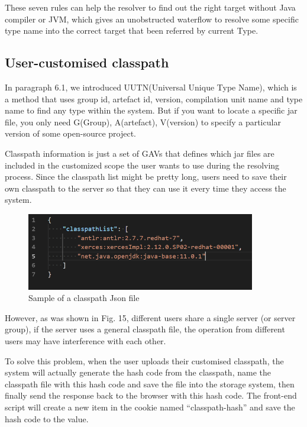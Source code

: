\documentclass[runningheads]{llncs}
\begin{document}
These seven rules can help the resolver to find out the right target without Java compiler or JVM, which gives an unobstructed waterflow to resolve some specific type name into the correct target that been referred by current Type.

\subsection{User-customised classpath}
In paragraph 6.1, we introduced UUTN(Universal Unique Type Name), which is a method that uses group id, artefact id, version, compilation unit name and type name to find any type within the system. But if you want to locate a specific jar file, you only need G(Group), A(artefact), V(version) to specify a particular version of some open-source project.

Classpath information is just a set of GAVs that defines which jar files are included in the customized scope the user wants to use during the resolving process. Since the classpath list might be pretty long, users need to save their own classpath to the server so that they can use it every time they access the system.


\begin{figure}[H]
	\centering
	\includegraphics[width=10cm]{pic/classpath-json.png}
	\caption{Sample of a classpath Json file}
	\label{Sample of a classpath Json file}
\end{figure}

However, as was shown in Fig. 15, different users share a single server (or server group), if the server uses a general classpath file, the operation from different users may have interference with each other.

To solve this problem, when the user uploads their customised classpath, the system will actually generate the hash code from the classpath, name the classpath file with this hash code and save the file into the storage system, then finally send the response back to the browser with this hash code. The front-end script will create a new item in the cookie named “classpath-hash” and save the hash code to the value.
\end{document}
